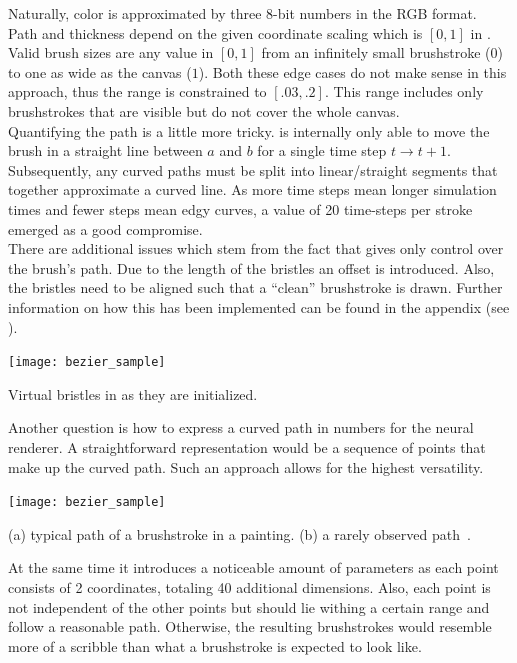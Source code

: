 Naturally, color is approximated by three 8-bit numbers in the RGB format.\\
Path and thickness depend on the given coordinate scaling which is $[0, 1]$ in .
Valid brush sizes are any value in $[0, 1]$ from an infinitely small brushstroke ($0$) to one as wide as the canvas ($1$).
Both these edge cases do not make sense in this approach, thus the range is constrained to $[.03, .2]$.
This range includes only brushstrokes that are visible but do not cover the whole canvas.\\

Quantifying the path is a little more tricky.
 is internally only able to move the brush in a straight line between $a$ and $b$ for a single time step $t \rightarrow t+1$.
Subsequently, any curved paths must be split into linear/straight segments that together approximate a curved line.
As more time steps mean longer simulation times and fewer steps mean edgy curves, a value of 20 time-steps per stroke emerged as a good compromise.\\
There are additional issues which stem from the fact that  gives only control over the brush's path.
Due to the length of the bristles an offset is introduced.
Also, the bristles need to be aligned such that a ``clean'' brushstroke is drawn.
Further information on how this has been implemented can be found in the appendix (see ).
\begin{marginfigure}
    \texttt{[image: bezier\_sample]}
    \caption[]{Virtual bristles in  as they are initialized.}
\end{marginfigure}

Another question is how to express a curved path in numbers for the neural renderer.
A straightforward representation would be a sequence of points that make up the curved path.
Such an approach allows for the highest versatility.
\begin{marginfigure}
    \texttt{[image: bezier\_sample]}
    \caption[]{(a) typical path of a brushstroke in a painting. (b) a rarely observed path~\cite{onlygfx}.}
\end{marginfigure}
At the same time it introduces a noticeable amount of parameters as each point consists of 2 coordinates, totaling 40 additional dimensions.
Also, each point is not independent of the other points but should lie withing a certain range and follow a reasonable path. 
Otherwise, the resulting brushstrokes would resemble more of a scribble than what a brushstroke is expected to look like.

